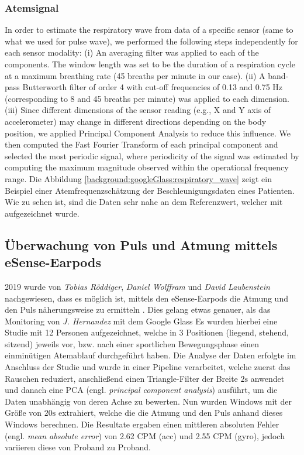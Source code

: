 \subsubsection{Atemsignal}

In order to estimate the respiratory wave from data of a specific sensor (same to what we used for pulse wave), we performed the following steps independently for each sensor modality:
(i) An averaging filter was applied to each of the
components. The window length was set to be the
duration of a respiration cycle at a maximum breathing
rate (45 breaths per minute in our case).
(ii) A band-pass Butterworth filter of order 4 with cut-off
frequencies of 0.13 and 0.75  Hz (corresponding to 8
and 45 breaths per minute) was applied to each
dimension.
(iii) Since different dimensions of the sensor reading
(e.g.,  X and Y axis of accelerometer) may change in
different directions depending on the body position,
we  applied  Principal Component Analysis  to reduce
this influence.  We then computed the Fast Fourier
Transform of each principal  component and selected 
the most periodic signal, where  periodicity of the signal was estimated by computing the maximum magnitude observed within the operational frequency
range.
Die Abbildung \ref{background:googleGlass:respiratory_wave} zeigt ein Beispiel einer Atemfrequenzschätzung der Beschleunigungsdaten eines Patienten. Wie zu sehen ist, sind die Daten sehr nahe an dem Referenzwert, welcher mit aufgezeichnet wurde.


\subsection{Überwachung von Puls und Atmung mittels eSense-Earpods}
2019 wurde von \textit{Tobias Röddiger}, \textit{Daniel Wolffram} und \textit{David Laubenstein} nachgewiesen, dass es möglich ist, mittels den eSense-Earpods die Atmung und den Puls näherungsweise zu ermitteln \cite{roddiger_towards_2019}. 
Dies gelang etwas genauer, als das Monitoring von \textit{J. Hernandez} mit dem Google Glass \cite{hernandez_cardiac_nodate}
Es wurden hierbei eine Studie mit 12 Personen aufgezeichnet, welche in 3 Positionen (liegend, stehend, sitzend) jeweils vor, bzw. nach einer sportlichen Bewegungsphase einen einminütigen Atemablauf durchgeführt haben. 
Die Analyse der Daten erfolgte im Anschluss der Studie und wurde in einer Pipeline verarbeitet, welche zuerst das Rauschen reduziert, anschließend einen Triangle-Filter der Breite $2\si{\s}$ anwendet und danach eine PCA (engl. \textit{principal component analysis}) ausführt, um die Daten unabhängig von deren Achse zu bewerten.
Nun wurden Windows mit der Größe von $20\si{\s}$ extrahiert, welche die die Atmung und den Puls anhand dieses Windows berechnen.
Die Resultate ergaben einen mittleren absoluten Fehler (engl. \textit{mean absolute error}) von 2.62 CPM (acc) und 2.55 CPM (gyro), jedoch variieren diese von Proband zu Proband.